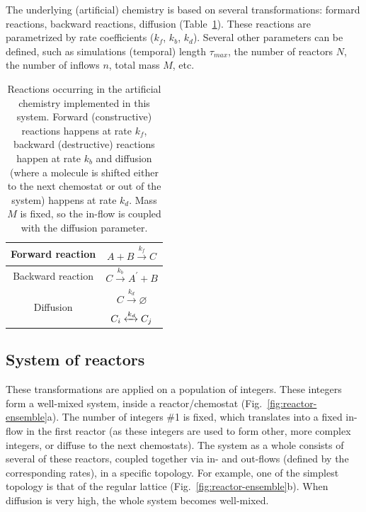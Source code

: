 \documentclass[11pt]{article}
\begin{document}
The underlying (artificial) chemistry is based on several transformations: formard reactions, backward reactions, diffusion (Table~\ref{tab:reactions}). These reactions are parametrized by rate coefficients ($k_f$, $k_b$, $k_d$). Several other parameters can be defined, such as simulations (temporal) length $\tau_{max}$, the number of reactors $N$, the number of inflows $n$, total mass $M$, etc.

\begin{table}[h]
\centering
\begin{tabular}{|c|c|}
\hline Forward reaction & $A+B \xrightarrow{k_f} C$ \\
\hline Backward reaction & $C \xrightarrow{k_b} A^{\prime}+B$ \\
\hline \multirow{2}{*}{ Diffusion } & $C \xrightarrow{k_d} \varnothing$ \\
\cline { 2 - 2 } & $C_i \xleftrightarrow{k_d} C_j$ \\
\hline
\end{tabular}  
\caption{Reactions occurring in the artificial chemistry implemented in this system. Forward (constructive) reactions happens at rate $k_f$, backward (destructive) reactions happen at rate $k_b$ and diffusion (where a molecule is shifted either to the next chemostat or out of the system) happens at rate $k_d$. Mass $M$ is fixed, so the in-flow is coupled with the diffusion parameter.}
\label{tab:reactions}
\end{table}

\subsection{System of reactors}

These transformations are applied on a population of integers. These integers form a well-mixed system, inside a reactor/chemostat (Fig.~\ref{fig:reactor-ensemble}a). The number of integers \#1 is fixed, which translates into a fixed in-flow in the first reactor (as these integers are used to form other, more complex integers, or diffuse to the next chemostats). The system as a whole consists of several of these reactors, coupled together via in- and out-flows (defined by the corresponding rates), in a specific topology. For example, one of the simplest topology is that of the regular lattice (Fig.~\ref{fig:reactor-ensemble}b). When diffusion is very high, the whole system becomes well-mixed.
\end{document}
